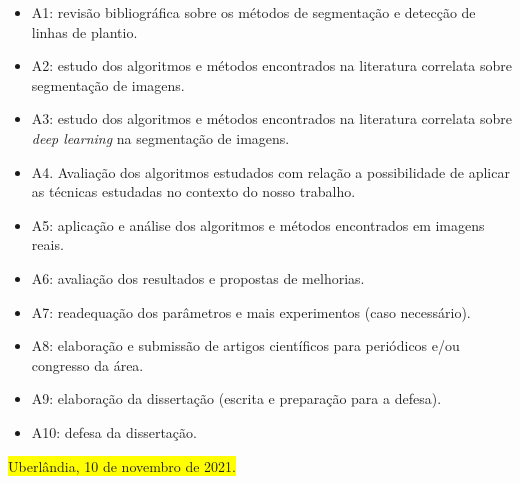 \documentclass[12pt, a4paper, english, brazil]{article}
\newcommand{\boxYellow}[1]{\colorbox{yellow}{#1}}
\begin{document}
\begin{itemize}
    \item A1: revisão bibliográfica sobre os métodos de segmentação e detecção de linhas de plantio.
    \item A2: estudo dos algoritmos e métodos encontrados na literatura correlata sobre segmentação de imagens.
    \item A3: estudo dos algoritmos e métodos encontrados na literatura correlata sobre \textit{deep learning} na segmentação de imagens.
    \item A4. Avaliação dos algoritmos estudados com relação a possibilidade de aplicar as técnicas estudadas no contexto do nosso trabalho.
    \item A5: aplicação e análise dos algoritmos e métodos encontrados em imagens reais.
    \item A6: avaliação dos resultados e propostas de melhorias.
    \item A7: readequação dos parâmetros e mais experimentos (caso necessário).
    \item A8: elaboração e submissão de artigos científicos para periódicos e/ou congresso da área.
    \item A9: elaboração da dissertação (escrita e preparação para a defesa).
    \item A10: defesa da dissertação.
\end{itemize}



\bigskip
\noindent \boxYellow{Uberlândia, 10 de novembro de 2021.}


\end{document}
